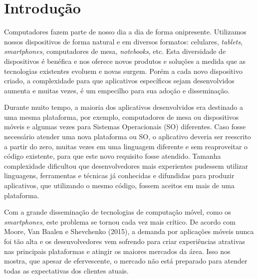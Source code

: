 \section{\esp Introdução}

Computadores fazem parte de nosso dia a dia de forma onipresente. Utilizamos nossos dispositivos de forma natural e em diversos formatos: celulares, \textit{tablets}, \textit{smartphones}, computadores de mesa, \textit{notebooks}, etc. Esta diversidade de dispositivos é benéfica e nos oferece novos produtos e soluções a medida que as tecnologias existentes evoluem e novas surgem. Porém a cada novo dispositivo criado, a complexidade para que aplicativos específicos sejam desenvolvidos aumenta e muitas vezes, é um empecilho para sua adoção e disseminação.

Durante muito tempo, a maioria dos aplicativos desenvolvidos era destinado a uma mesma plataforma, por exemplo, computadores de mesa ou dispositivos móveis e algumas vezes para Sistemas Operacionais (SO) diferentes. Caso fosse necessário atender uma nova plataforma ou SO, o aplicativo deveria ser reescrito a partir do zero, muitas vezes em uma linguagem diferente e sem reaproveitar o código existente, para que este novo requisito fosse atendido. Tamanha complexidade dificultou que desenvolvedores mais experientes pudessem utilizar linguagens, ferramentas e técnicas já conhecidas e difundidas para produzir aplicativos, que utilizando o mesmo código, fossem aceitos em mais de uma plataforma.

Com a grande disseminação de tecnologias de computação móvel, como os \textit{smartphones}, este problema se tornou cada vez mais crítico. De acordo com Moore, Van Baalen e Shevchenko (2015), a demanda por aplicações móveis nunca foi tão alta e os desenvolvedores vem sofrendo para criar experiências atrativas nas principais plataformas e atingir os maiores mercados da área. Isso nos mostra, que apesar de efervescente, o mercado não está preparado para atender todas as expectativas dos clientes atuais.

